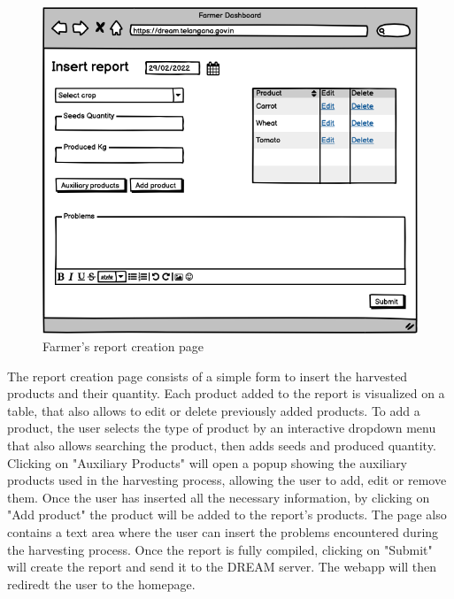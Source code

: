 \documentclass[10pt]{article} %
\begin{document}
\begin{figure}[h]
    \centering
    \includegraphics[scale=0.4]{images/uimockups/f_report.png}
    \caption{Farmer's report creation page}
    \label{fig:ui_f_report}
\end{figure}
The report creation page consists of a simple form to insert the harvested products and their quantity. Each product added to the report is visualized 
on a table, that also allows to edit or delete previously added products. To add a product, the user selects the type of product by an interactive dropdown
menu that also allows searching the product, then adds seeds and produced quantity. Clicking on "Auxiliary Products" will open a popup showing the auxiliary
products used in the harvesting process, allowing the user to add, edit or remove them. Once the user has inserted all the necessary information, by clicking on "Add product"
the product will be added to the report's products. The page also contains a text area where the user can insert the problems encountered during the harvesting process. 
Once the report is fully compiled, clicking on "Submit" will create the report and send it to the DREAM server. The webapp will then rediredt the user to the homepage. \\
\end{document}
